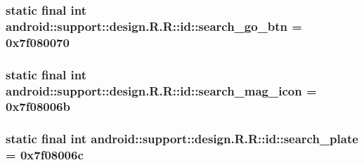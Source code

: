 \hypertarget{classandroid_1_1support_1_1design_1_1_r_1_1id_466e475d6f1778164e389fe81d038448}{
\subsubsection[{search\_\-go\_\-btn}]{\setlength{\rightskip}{0pt plus 5cm}static final int android::support::design.R.R::id::search\_\-go\_\-btn = 0x7f080070}}
\label{classandroid_1_1support_1_1design_1_1_r_1_1id_466e475d6f1778164e389fe81d038448}


\hypertarget{classandroid_1_1support_1_1design_1_1_r_1_1id_6686f70a172b6e21cc0cfc86b32e616d}{
\subsubsection[{search\_\-mag\_\-icon}]{\setlength{\rightskip}{0pt plus 5cm}static final int android::support::design.R.R::id::search\_\-mag\_\-icon = 0x7f08006b}}
\label{classandroid_1_1support_1_1design_1_1_r_1_1id_6686f70a172b6e21cc0cfc86b32e616d}


\hypertarget{classandroid_1_1support_1_1design_1_1_r_1_1id_acf262c2a8b734edb51feb578155531a}{
\subsubsection[{search\_\-plate}]{\setlength{\rightskip}{0pt plus 5cm}static final int android::support::design.R.R::id::search\_\-plate = 0x7f08006c}}
\label{classandroid_1_1support_1_1design_1_1_r_1_1id_acf262c2a8b734edb51feb578155531a}


